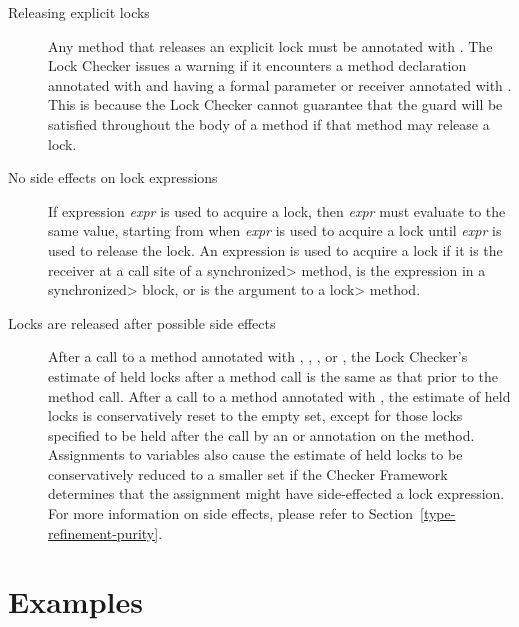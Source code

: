 \begin{description}

\item[Releasing explicit locks]
  Any method that releases an explicit lock must be annotated
  with .
  The Lock Checker issues a warning if it encounters a method declaration
  annotated with  and having a formal parameter
  or receiver annotated with .  This is because
  the Lock Checker cannot guarantee that the guard will be satisfied
  throughout the body of a method if that method may release a lock.

\item[No side effects on lock expressions]
  If expression \emph{expr} is used to acquire a lock, then
  \emph{expr} must evaluate to the same value, starting from when
  \emph{expr} is used to acquire a lock until \emph{expr} is used to
  release the lock.
  An expression is used to acquire a lock if it is the receiver at a
  call site of a \<synchronized> method, is the expression in a
  \<synchronized> block, or is the argument to a \<lock> method.

\item[Locks are released after possible side effects]
  After a call to a method annotated with ,
  , , or ,
  the Lock Checker's estimate of held locks
  after a method call is the same as that prior to the method call.
  After a call to a method annotated with ,
  the estimate of held locks is conservatively reset to the empty set,
  except for those locks specified to be held after the call
  by an  or 
  annotation on the method.  Assignments to variables also
  cause the estimate of held locks to be conservatively reduced
  to a smaller set if the Checker Framework determines that the
  assignment might have side-effected a lock expression.
  For more information on side effects, please refer to
  Section~\ref{type-refinement-purity}.

\end{description}


\section{Examples\label{lock-examples}}

